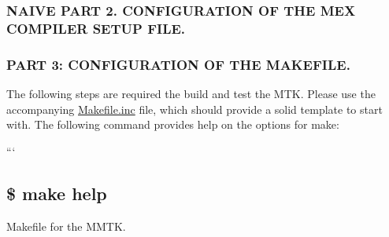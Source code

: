 \begin{DoxyPre}\subsubsection*{NAIVE PART 2. CONFIGURATION OF THE MEX COMPILER SETUP FILE.}\end{DoxyPre}



\begin{DoxyPre}\end{DoxyPre}






\begin{DoxyPre}\subsubsection*{PART 3: CONFIGURATION OF THE MAKEFILE.}\end{DoxyPre}



\begin{DoxyPre}\end{DoxyPre}



\begin{DoxyPre}The following steps are required the build and test the MTK. Please use the
accompanying {\ttfamily \hyperlink{Makefile_8inc}{Makefile.inc}} file, which should provide a solid template to
start with. The following command provides help on the options for make:\end{DoxyPre}



\begin{DoxyPre}```
\subsection*{\$ make help
}\end{DoxyPre}



\begin{DoxyPre}
Makefile for the MMTK.\end{DoxyPre}



